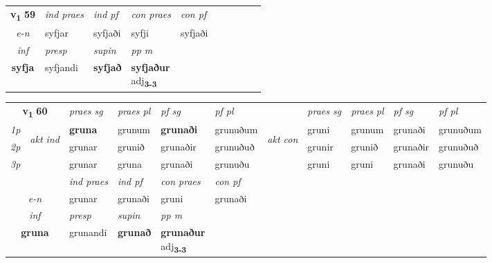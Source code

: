 \noindent
\begin{tabular}{lllllllllll} \toprule
\multicolumn{2}{c}{\textbf{v{\textsubscript{1}}} \Large{\textbf{59}}}  &  \textit{ind praes} & \textit{ind pf} & \textit{con praes} & \textit{con pf} \\*
\multicolumn{2}{c}{ \textit{e-n} } & syfjar & syfjaði & syfji & syfjaði \\*

\cmidrule{3-5}
   \multicolumn{2}{c}{\textit{inf}}     & \textit{presp} & \textit{supin}  & \textit{pp m} \\*
  \multicolumn{2}{c}{\textbf{syfja}}      & syfjandi &  \textbf{syfjað}  & \specialcell{\textbf{syfjaður} \\ adj\textbf{\textsubscript{3-3}}} \\*
\end{tabular}

\noindent
\begin{tabular}{lllllllllll} \toprule
\multicolumn{2}{c}{\textbf{v{\textsubscript{1}}} \Large{\textbf{60}}}  &  \textit{praes sg}  & \textit{praes pl}  &\textit{ pf sg} & \textit{pf pl} &  &  \textit{praes sg}  & \textit{praes pl}  & \textit{pf sg} & \textit{pf pl } \\*
	\cmidrule{3-6} \cmidrule{8-11}
 {\textit{1p}} & \multirow{3}{*}{\begin{turn}{90}\textit{akt ind}\end{turn}} & \textbf{gruna} & grunum & \textbf{grunaði} & grunuðum & \multirow{3}{*}{\begin{turn}{90}\textit{akt con}\end{turn}} &gruni & grunum & grunaði & grunuðum\\*
 {\textit{2p}} &  &  grunar  & grunið & grunaðir & grunuðuð & & grunir & grunið & grunaðir & grunuðuð \\*
{\textit{3p}} &  & grunar & gruna & grunaði & grunuðu & & gruni & gruni& grunaði & grunuðu \\*
\cmidrule{3-6} \cmidrule{8-11}

   & &  \textit{ind praes} & \textit{ind pf} & \textit{con praes} & \textit{con pf} \\*
\multicolumn{2}{c}{ \textit{e-n} } & grunar & grunaði & gruni & grunaði \\*

\cmidrule{3-5}
   \multicolumn{2}{c}{\textit{inf}}     & \textit{presp} & \textit{supin}  & \textit{pp m} \\*
  \multicolumn{2}{c}{\textbf{gruna}}      & grunandi &  \textbf{grunað}  & \specialcell{\textbf{grunaður} \\ adj\textbf{\textsubscript{3-3}}} \\*
\end{tabular}

